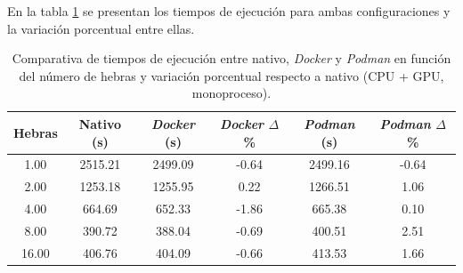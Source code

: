 En la tabla \ref{tab:single-node_ubuntu_container_vs_native_gpu} se presentan los tiempos de ejecución para ambas configuraciones y la variación porcentual entre ellas.

\begin{table}[ht]
    \centering
    \small
    \setlength{\tabcolsep}{4pt}
    \renewcommand{\arraystretch}{1.1}
    \begin{tabular}{|c|c|c|c|c|c|}
        \hline
        \textbf{Hebras} & \textbf{Nativo (s)} & \textbf{\textit{Docker} (s)} & \textbf{\textit{Docker} $\Delta$\%} & \textbf{\textit{Podman} (s)} & \textbf{\textit{Podman} $\Delta$\%} \\
        \hline
        1.00            & 2515.21             & 2499.09                      & -0.64                               & 2499.16                      & -0.64                               \\
        2.00            & 1253.18             & 1255.95                      & 0.22                                & 1266.51                      & 1.06                                \\
        4.00            & 664.69              & 652.33                       & -1.86                               & 665.38                       & 0.10                                \\
        8.00            & 390.72              & 388.04                       & -0.69                               & 400.51                       & 2.51                                \\
        16.00           & 406.76              & 404.09                       & -0.66                               & 413.53                       & 1.66                                \\
        \hline
    \end{tabular}
    \caption{Comparativa de tiempos de ejecución entre nativo, \textit{Docker} y \textit{Podman} en función del número de hebras y variación porcentual respecto a nativo (CPU + GPU, monoproceso).}
    \label{tab:single-node_ubuntu_container_vs_native_gpu}
\end{table}

